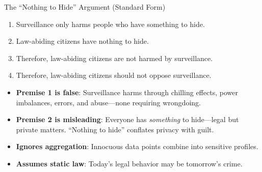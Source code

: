 ﻿\documentclass[aspectratio=169,11pt]{beamer}
\begin{document}
\begin{frame}{The ``Nothing to Hide'' Argument (Standard Form)}
\begin{probox}
\scriptsize
\begin{enumerate}
    \item Surveillance only harms people who have something to hide.
    \item Law-abiding citizens have nothing to hide.
    \item Therefore, law-abiding citizens are not harmed by surveillance.
    \item Therefore, law-abiding citizens should not oppose surveillance.
\end{enumerate}
\end{probox}

\begin{objectionbox}
\scriptsize
\begin{itemize}
    \item \textbf{Premise 1 is false}: Surveillance harms through chilling effects, power imbalances, errors, and abuse---none requiring wrongdoing.
    \item \textbf{Premise 2 is misleading}: Everyone has \emph{something} to hide---legal but private matters. ``Nothing to hide'' conflates privacy with guilt.
    \item \textbf{Ignores aggregation}: Innocuous data points combine into sensitive profiles.
    \item \textbf{Assumes static law}: Today's legal behavior may be tomorrow's crime.
\end{itemize}
\end{objectionbox}
\end{frame}
\end{document}
